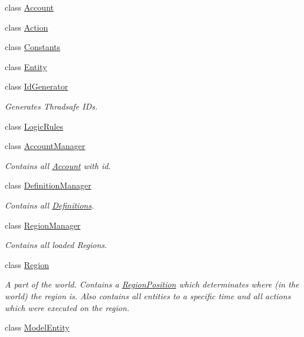 \begin{DoxyCompactItemize}
\item 
class \hyperlink{classCore_1_1Models_1_1Account}{Account}
\item 
class \hyperlink{classCore_1_1Models_1_1Action}{Action}
\item 
class \hyperlink{classCore_1_1Models_1_1Constants}{Constants}
\item 
class \hyperlink{classCore_1_1Models_1_1Entity}{Entity}
\item 
class \hyperlink{classCore_1_1Models_1_1IdGenerator}{Id\-Generator}
\begin{DoxyCompactList}\small\item\em Generates Thradsafe I\-Ds. \end{DoxyCompactList}\item 
class \hyperlink{classCore_1_1Models_1_1LogicRules}{Logic\-Rules}
\item 
class \hyperlink{classCore_1_1Models_1_1AccountManager}{Account\-Manager}
\begin{DoxyCompactList}\small\item\em Contains all \hyperlink{classCore_1_1Models_1_1Account}{Account} with id. \end{DoxyCompactList}\item 
class \hyperlink{classCore_1_1Models_1_1DefinitionManager}{Definition\-Manager}
\begin{DoxyCompactList}\small\item\em Contains all \hyperlink{namespaceCore_1_1Models_1_1Definitions}{Definitions}. \end{DoxyCompactList}\item 
class \hyperlink{classCore_1_1Models_1_1RegionManager}{Region\-Manager}
\begin{DoxyCompactList}\small\item\em Contains all loaded Regions. \end{DoxyCompactList}\item 
class \hyperlink{classCore_1_1Models_1_1Region}{Region}
\begin{DoxyCompactList}\small\item\em A part of the world. Contains a \hyperlink{classCore_1_1Models_1_1RegionPosition}{Region\-Position} which determinates where (in the world) the region is. Also contains all entities to a specific time and all actions which were executed on the region. \end{DoxyCompactList}\item 
class \hyperlink{classCore_1_1Models_1_1ModelEntity}{Model\-Entity}

\end{DoxyCompactItemize}
